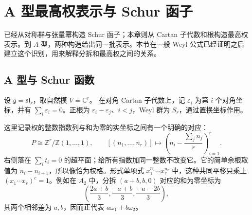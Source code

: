 %
%

\section{A 型最高权表示与 Schur 函子}
\label{b5:sec:1906}

已经从对称群与张量幂构造 Schur 函子；本章则从 Cartan 子代数和根构造最高权表示。到 \(A\) 型，两种构造给出同一批表示。本节在一般 Weyl 公式已经证明之后建立这个识别，用来解释分拆和最高权之间的关系。

\subsection{A 型与 Schur 函数}
\label{b5:subsec:1906:01}

设 \(\mathfrak g=\mathfrak{sl}_r\)，取自然模 \(V=\mathbb C^r\)。 在对角 Cartan 子代数上，记 \(\varepsilon_i\) 为第 \(i\) 个对角坐标，并有 \(\sum_i\varepsilon_i=0\)。正根为 \(\varepsilon_i-\varepsilon_j\)、\(i<j\)，Weyl 群为 \(S_r\)，通过置换坐标作用。

\ProseParagraphBreak
这里记录权的整数指数列与和为零的实坐标之间有一个明确的对应：
\[
	P\cong\mathbb Z^r/\mathbb Z(1,\ldots,1),\qquad [(n_1,\ldots,n_r)]\longmapsto \left(n_i-\frac{\sum_j n_j}{r}\right)_{i=1}^r.
\]
右侧落在 \(\sum_i t_i=0\) 的超平面；给所有指数加同一整数不改变它。它的简单余根取值为 \(n_i-n_{i+1}\)，所以像恰为权格。形式单项式 \(x_1^{n_1}\cdots x_r^{n_r}\) 中，这种共同平移只乘上 \((x_1\cdots x_r)^c=1\)。例如在 \(A_2\) 中，分拆 \((a+b,b,0)\) 对应的和为零坐标为
\[
	\left(\frac{2a+b}{3},\frac{-a+b}{3},\frac{-a-2b}{3}\right),
\]
其两个相邻差为 \(a,b\)，因而正代表 \(a\omega_1+b\omega_2\)。


